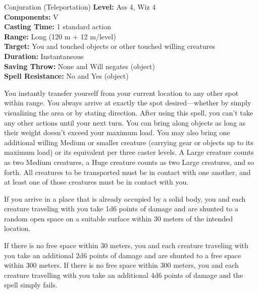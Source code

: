 {Conjuration (Teleportation)}
{
	\textbf{Level:}
	Ass 4, Wiz 4\\
	\textbf{Components:}
	V\\
	\textbf{Casting Time:}
	1 standard action\\
	\textbf{Range:}
	Long (120 m + 12 m/level)\\
	\textbf{Target:}
	You and touched objects or other touched willing creatures\\
	\textbf{Duration:}
	Instantaneous\\
	\textbf{Saving Throw:}
	None and Will negates (object)\\
	\textbf{Spell Resistance:}
	No and Yes (object)\\
}
{
	You instantly transfer yourself from your current location to any other spot within range. You always arrive at exactly the spot desired---whether by simply visualizing the area or by stating direction. After using this spell, you can't take any other actions until your next turn. You can bring along objects as long as their weight doesn't exceed your maximum load. You may also bring one additional willing Medium or smaller creature (carrying gear or objects up to its maximum load) or its equivalent per three caster levels. A Large creature counts as two Medium creatures, a Huge creature counts as two Large creatures, and so forth. All creatures to be transported must be in contact with one another, and at least one of those creatures must be in contact with you.

	If you arrive in a place that is already occupied by a solid body, you and each creature traveling with you take 1d6 points of damage and are shunted to a random open space on a suitable surface within 30 meters of the intended location.

	If there is no free space within 30 meters, you and each creature traveling with you take an additional 2d6 points of damage and are shunted to a free space within 300 meters. If there is no free space within 300 meters, you and each creature travelling with you take an additional 4d6 points of damage and the spell simply fails.

}
